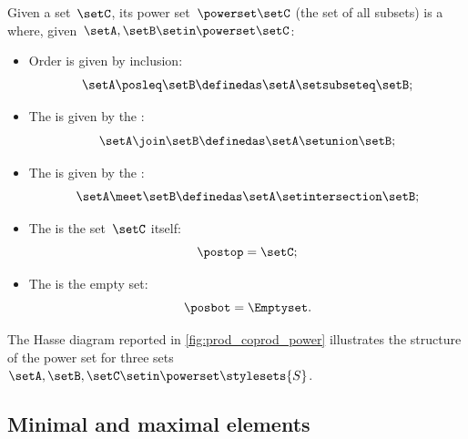 \begin{ctdefinition}
    \label{def:power-set-as-lattice}
    Given a set~$\setC$, its power set~$\powerset \setC$ (the set of all subsets) is a  where, given~$\setA,\setB\setin \powerset \setC$:
    \begin{itemize}
        \item Order is given by inclusion:
              \begin{equation}
                  \setA\posleq \setB \definedas \setA\setsubseteq \setB;
              \end{equation}
        \item The  is given by the :
              \begin{equation}
                  \setA\join \setB \definedas \setA\setunion \setB;
              \end{equation}
        \item The  is given by the :
              \begin{equation}
                  \setA\meet \setB \definedas \setA\setintersection \setB;
              \end{equation}
        \item The  is the set~$\setC$ itself:
              \begin{equation}
                  \postop = \setC;
              \end{equation}
        \item The  is the empty set:
              \begin{equation}
                  \posbot = \Emptyset.
              \end{equation}
    \end{itemize}
\end{ctdefinition}

\begin{marginfigure}
    \centering
    \caption{}
    \label{fig:prod_coprod_power}
\end{marginfigure}

The Hasse diagram reported in \cref{fig:prod_coprod_power} illustrates the structure of the power set  for three sets~$\setA,\setB,\setC\setin \powerset \stylesets{S}$.


\subsection{Minimal and maximal elements}

